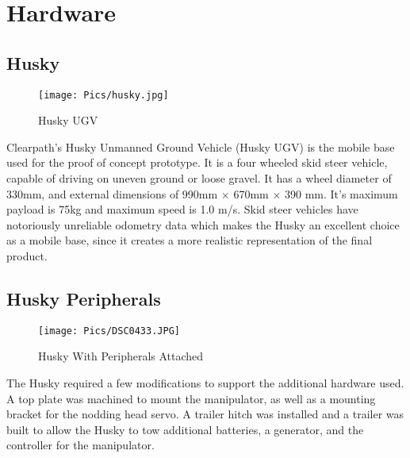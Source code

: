 \section{Hardware}
\subsection{Husky}
\begin{figure}[H]
    \centering
    \texttt{[image: Pics/husky.jpg]}
    \caption{Husky UGV \cite{huskypage}}
    \label{fig:husky}
\end{figure}
Clearpath's Husky Unmanned Ground Vehicle (Husky UGV) is the mobile base used for the proof of concept prototype. It is a four wheeled skid steer vehicle, capable of driving on uneven ground or loose gravel. It has a wheel diameter of 330mm, and external dimensions of 990mm $\times$ 670mm $\times$ 390 mm. It's maximum payload is 75kg and maximum speed is 1.0 m/s. Skid steer vehicles have notoriously unreliable odometry data which makes the Husky an excellent choice as a mobile base, since it creates a more realistic representation of the final product.\\
\subsection{Husky Peripherals}

\begin{figure}[H]
    \centering
    \texttt{[image: Pics/DSC0433.JPG]}
    \caption{Husky With Peripherals Attached}
    \label{fig:peripherals}
\end{figure}
The Husky required a few modifications to support the additional hardware used. A top plate was machined to mount the manipulator, as well as a mounting bracket for the nodding head servo. A trailer hitch was installed and a trailer was built to allow the Husky to tow additional batteries, a generator, and the controller for the manipulator.\\
